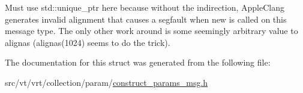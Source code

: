 Must use {\ttfamily std\+::unique\+\_\+ptr} here because without the indirection, Apple\+Clang generates invalid alignment that causes a segfault when {\ttfamily new} is called on this message type. The only other work around is some seemingly arbitrary value to alignas (alignas(1024) seems to do the trick). 

The documentation for this struct was generated from the following file\+:\begin{DoxyCompactItemize}
\item 
src/vt/vrt/collection/param/\hyperlink{construct__params__msg_8h}{construct\+\_\+params\+\_\+msg.\+h}\end{DoxyCompactItemize}
